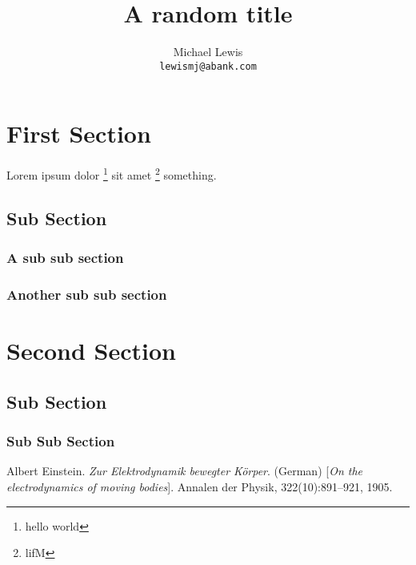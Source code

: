 \documentclass[twocolumn]{article}
\title{A random title}
\author{Michael Lewis\\
{\tt\small lewismj@abank.com}
}
\begin{document}
\maketitle

\begin{abstract}
\lipsum[1-1]
\end{abstract}

\tableofcontents
\medskip
\medskip
\section{First Section}
 Lorem ipsum dolor \footnote {hello world} sit amet
 \footnote{lifM} something.
	\lipsum[1-2]
	\subsection{Sub Section}
		\subsubsection{A sub sub section}
			\lipsum[1-1]
	\subsubsection{Another sub sub section}
		\lipsum[1-1]
\section{Second Section}
	\subsection{Sub Section}
		\subsubsection{Sub Sub Section}
			\lipsum[1-5]
			
\begin{thebibliography}{9}

Albert Einstein. 
\textit{Zur Elektrodynamik bewegter K{\"o}rper}. (German) 
[\textit{On the electrodynamics of moving bodies}]. 
Annalen der Physik, 322(10):891–921, 1905.

 \end{thebibliography}
\end{document}
